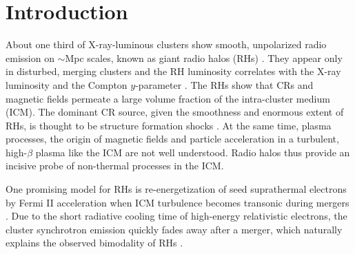\documentclass[useAMS,usenatbib]{mn2e}
\begin{document}
\section{Introduction}
About one third of X-ray-luminous clusters show smooth, unpolarized
radio emission on $\sim$Mpc scales, known as giant radio halos (RHs)
\citep{2014IJMPD..2330007B}. They appear only in disturbed, merging
clusters and the RH luminosity correlates with the X-ray luminosity
\citep{2001A&A...369..441G,2012A&ARv..20...54F} and the Compton
$y$-parameter \citep{2013A&A...554A.140P}. The RHs show that CRs and
magnetic fields permeate a large volume fraction of the intra-cluster
medium (ICM). The dominant CR source, given the smoothness and
enormous extent of RHs, is thought to be structure formation shocks
\citep{miniati01,pfrommer08}. At the same time, plasma processes, the
origin of magnetic fields and particle acceleration in a turbulent,
high-$\beta$ plasma like the ICM are not well understood. Radio halos
thus provide an incisive probe of non-thermal processes in the ICM.

One promising model for RHs is re-energetization of seed suprathermal
electrons by Fermi II acceleration when ICM turbulence becomes transonic during
mergers \citep{2001MNRAS.320..365B,brunetti07}. Due to the short radiative
cooling time of high-energy relativistic electrons, the cluster synchrotron
emission quickly fades away after a merger, which naturally explains the
observed bimodality of RHs \cite[see
 e.g.][]{2013MNRAS.429.3564D,2014MNRAS.443.3564D}.
\end{document}
